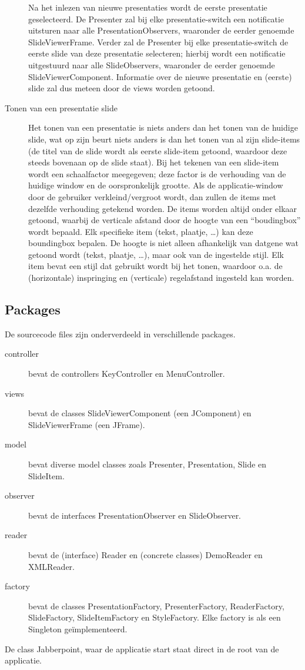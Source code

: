 \documentclass[a4paper]{article}
\begin{document}
\begin{description}
Na het inlezen van nieuwe presentaties wordt de eerste presentatie geselecteerd. De Presenter zal bij elke presentatie-switch een notificatie uitsturen naar alle PresentationObservers, waaronder de eerder genoemde SlideViewerFrame. Verder zal de Presenter bij elke presentatie-switch de eerste slide van deze presentatie selecteren; hierbij wordt een notificatie uitgestuurd naar alle SlideObservers, waaronder de eerder genoemde SlideViewerComponent. Informatie over de nieuwe presentatie en (eerste) slide zal dus meteen door de views worden getoond.
\item[Tonen van een presentatie slide]
Het tonen van een presentatie is niets anders dan het tonen van de huidige slide, wat op zijn beurt niets anders is dan het tonen van al zijn slide-items (de titel van de slide wordt als eerste slide-item getoond, waardoor deze steeds bovenaan op de slide staat). Bij het tekenen van een slide-item wordt een schaalfactor meegegeven; deze factor is de verhouding van de huidige window en de oorspronkelijk grootte. Als de applicatie-window door de gebruiker verkleind/vergroot wordt, dan zullen de items met dezelfde verhouding getekend worden.
De items worden altijd onder elkaar getoond, waarbij de verticale afstand door de hoogte van een “boudingbox” wordt bepaald. Elk specifieke item (tekst, plaatje, …) kan deze boundingbox bepalen. De hoogte is niet alleen afhankelijk van datgene wat getoond wordt (tekst, plaatje, …), maar ook van de ingestelde stijl. Elk item bevat een stijl dat gebruikt wordt bij het tonen, waardoor o.a. de (horizontale) inspringing en (verticale) regelafstand ingesteld kan worden.
\end{description}

\subsection{Packages}
De sourcecode files zijn onderverdeeld in verschillende packages.
\begin{description}
\item[controller] bevat de controllers KeyController en MenuController.
\item[views] bevat de classes SlideViewerComponent (een JComponent) en SlideViewerFrame (een JFrame).
\item[model] bevat diverse model classes zoals Presenter, Presentation, Slide en SlideItem.
\item[observer] bevat de interfaces PresentationObserver en SlideObserver.
\item[reader] bevat de (interface) Reader en (concrete classes) DemoReader en XMLReader.
\item[factory] bevat de classes PresentationFactory, PresenterFactory, ReaderFactory, SlideFactory, SlideItemFactory en StyleFactory. Elke factory is als een Singleton geïmplementeerd.
\end{description}
De class Jabberpoint, waar de applicatie start staat direct in de root van de applicatie.
\end{document}
